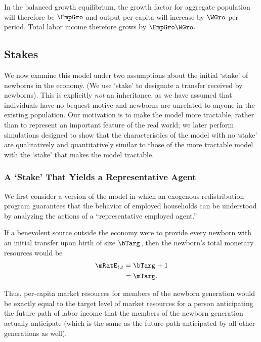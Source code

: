 \documentclass{\handout}
\begin{document}
In the balanced growth equilibrium, the growth factor for aggregate population
will therefore be $\EmpGro$ and output per capita will increase by $\WGro$ per period.  Total
labor income therefore grows by $\EmpGro \WGro.$


\subsection{Stakes}

We now examine this model under two assumptions about the initial
`stake' of newborns in the economy.  (We use `stake' to designate a
transfer received by newborns).  This is explicitly {\it not} an
inheritance, as we have assumed that individuals have no bequest
motive and newborns are unrelated to anyone in the existing
population.  Our motivation is to make the model more tractable,
rather than to represent an important feature of the real world; we
later perform simulations designed to show that the characteristics of
the model with no `stake' are qualitatively and quantitatively similar
to those of the more tractable model with the `stake' that makes the
model tractable.

\subsubsection{A `Stake' That Yields a Representative Agent}

We first consider a version of the model in which an exogenous
redistribution program guarantees that the behavior of employed households can 
be understood by analyzing the actions of a ``representative employed agent.''  

If a benevolent source outside the economy were to provide every newborn with an initial
transfer upon birth of size $\bTarg^{\null}$, then the newborn's total monetary resources 
would be
\begin{equation*}\begin{gathered}\begin{aligned}
  \mRatE_{t,t} & =  \bTarg^{\null} + 1
\\ & =  \mTarg^{\null} 
.
\end{aligned}\end{gathered}\end{equation*}

Thus, per-capita market resources for members of the newborn generation
would be exactly equal to the target level of market resources for a
person anticipating the future path of labor income that the members of the newborn
generation actually anticipate (which is the same as the future path
anticipated by all other generations as well).
\end{document}
